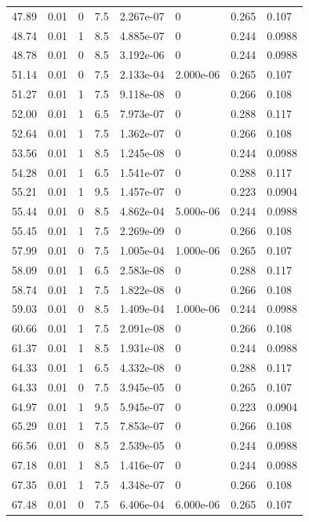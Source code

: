 \documentclass[preview]{standalone}
\begin{document}
{{{\begin{tabular}{L{1.2cm}C{1.2cm} C{0.3cm}C{0.5cm} C{1.4cm}C{1.4cm} C{1.4cm}C{1.4cm}}
  47.89  &  0.01  & 0     & 7.5 &  2.267e-07  & 0  & 0.265 &  0.107   \\ 
  48.74  &  0.01  & 1     & 8.5 &  4.885e-07  & 0  & 0.244 &  0.0988   \\ 
  48.78  &  0.01  & 0     & 8.5 &  3.192e-06  & 0  & 0.244 &  0.0988   \\ 
  51.14  &  0.01  & 0     & 7.5 &  2.133e-04  & 2.000e-06  & 0.265 &  0.107   \\ 
  51.27  &  0.01  & 1     & 7.5 &  9.118e-08  & 0  & 0.266 &  0.108   \\ 
  52.00  &  0.01  & 1     & 6.5 &  7.973e-07  & 0  & 0.288 &  0.117   \\ 
  52.64  &  0.01  & 1     & 7.5 &  1.362e-07  & 0  & 0.266 &  0.108   \\ 
  53.56  &  0.01  & 1     & 8.5 &  1.245e-08  & 0  & 0.244 &  0.0988   \\ 
  54.28  &  0.01  & 1     & 6.5 &  1.541e-07  & 0  & 0.288 &  0.117   \\ 
  55.21  &  0.01  & 1     & 9.5 &  1.457e-07  & 0  & 0.223 &  0.0904   \\ 
  55.44  &  0.01  & 0     & 8.5 &  4.862e-04  & 5.000e-06  & 0.244 &  0.0988   \\ 
  55.45  &  0.01  & 1     & 7.5 &  2.269e-09  & 0  & 0.266 &  0.108   \\ 
  57.99  &  0.01  & 0     & 7.5 &  1.005e-04  & 1.000e-06  & 0.265 &  0.107   \\ 
  58.09  &  0.01  & 1     & 6.5 &  2.583e-08  & 0  & 0.288 &  0.117   \\ 
  58.74  &  0.01  & 1     & 7.5 &  1.822e-08  & 0  & 0.266 &  0.108   \\ 
  59.03  &  0.01  & 0     & 8.5 &  1.409e-04  & 1.000e-06  & 0.244 &  0.0988   \\ 
  60.66  &  0.01  & 1     & 7.5 &  2.091e-08  & 0  & 0.266 &  0.108   \\ 
  61.37  &  0.01  & 1     & 8.5 &  1.931e-08  & 0  & 0.244 &  0.0988   \\ 
  64.33  &  0.01  & 1     & 6.5 &  4.332e-08  & 0  & 0.288 &  0.117   \\ 
  64.33  &  0.01  & 0     & 7.5 &  3.945e-05  & 0  & 0.265 &  0.107   \\ 
  64.97  &  0.01  & 1     & 9.5 &  5.945e-07  & 0  & 0.223 &  0.0904   \\ 
  65.29  &  0.01  & 1     & 7.5 &  7.853e-07  & 0  & 0.266 &  0.108   \\ 
  66.56  &  0.01  & 0     & 8.5 &  2.539e-05  & 0  & 0.244 &  0.0988   \\ 
  67.18  &  0.01  & 1     & 8.5 &  1.416e-07  & 0  & 0.244 &  0.0988   \\ 
  67.35  &  0.01  & 1     & 7.5 &  4.348e-07  & 0  & 0.266 &  0.108   \\ 
  67.48  &  0.01  & 0     & 7.5 &  6.406e-04  & 6.000e-06  & 0.265 &  0.107   \\ 
\hline 
\end{tabular} 

}}}
\end{document}
